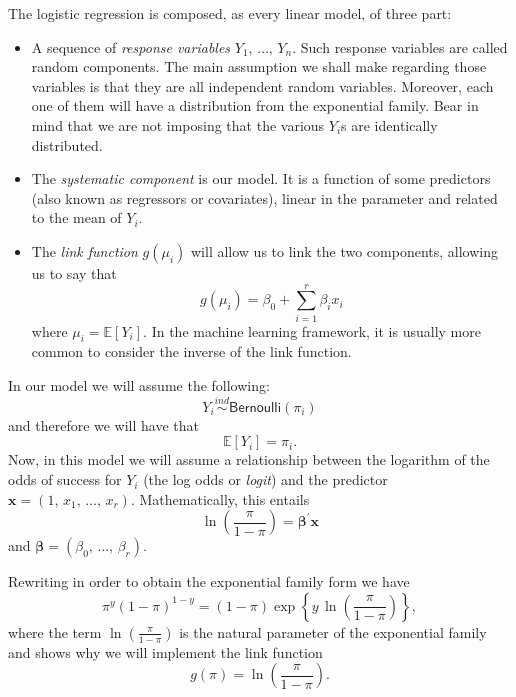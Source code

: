 \documentclass[a4paper]{article}
\begin{document}
The logistic regression is composed, as every linear model, of three
part:
\begin{itemize}
	\item A sequence of \textit{response variables} $Y_{1},\,\ldots,\,Y_{n}$.
	Such response variables are called random components. The main assumption
	we shall make regarding those variables is that they are all independent
	random variables. Moreover, each one of them will have a distribution
	from the exponential family. Bear in mind that we are not imposing
	that the various $Y_{i}$s are identically distributed.
	\item The \textit{systematic component} is our model. It is a function of
	some predictors (also known as regressors or covariates), linear in
	the parameter and related to the mean of $Y_{i}$.
	\item The \textit{link function} $g\left(\mu_{i}\right)$ will allow us
	to link the two components, allowing us to say that 
	\begin{equation}
	g\left(\mu_{i}\right)=\beta_{0}+\sum_{i=1}^{r}\beta_{i}x_{i}\label{eq:-3}
	\end{equation}
	where $\mu_{i}=\mathbb{E}\left[Y_{i}\right]$. In the machine learning
	framework, it is usually more common to consider the inverse of the
	link function.
\end{itemize}
In our model we will assume the following:
\begin{equation}
Y_{i}\overset{ind}{\sim}\mathsf{Bernoulli}\left(\pi_{i}\right)\label{eq:}
\end{equation}
and therefore we will have that 
\begin{equation}
\mathbb{E}\left[Y_{i}\right]=\pi_{i}.\label{eq:-1}
\end{equation}
Now, in this model we will assume a relationship between the logarithm
of the odds of success for $Y_{i}$ (the log odds or \textit{logit})
and the predictor $\mathbf{x}=\left(1,\,x_{1},\,\ldots,\,x_{r}\right)$.
Mathematically, this entails
\begin{equation}
\ln\left(\frac{\pi}{1-\pi}\right)=\mathbf{\beta^{\prime}\mathbf{x}}\label{eq:-6}
\end{equation}
and $\mathbf{\beta}=\left(\beta_{0},\,\ldots,\,\beta_{r}\right)$.

Rewriting in order to obtain the exponential family form we have
\begin{equation}
\pi^{y}\left(1-\pi\right)^{1-y}=\left(1-\pi\right)\exp\left\{ y\,\ln\left(\frac{\pi}{1-\pi}\right)\right\} ,\label{eq:-2}
\end{equation}
where the term $\ln\left(\frac{\pi}{1-\pi}\right)$ is the natural
parameter of the exponential family and shows why we will implement
the link function
\begin{equation}
g\left(\pi\right)=\ln\left(\frac{\pi}{1-\pi}\right).\label{eq:-4}
\end{equation}
\end{document}
